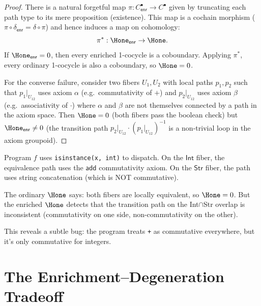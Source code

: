 \begin{proof}
There is a natural forgetful map
$\pi : C^\bullet_\mathsf{enr} \to C^\bullet$ given by truncating
each path type to its mere proposition (existence).  This map is a
cochain morphism ($\pi \circ \delta_\mathsf{enr} =
\delta \circ \pi$) and hence induces a map on cohomology:
\[
  \pi^* : \Hone_\mathsf{enr} \to \Hone.
\]
If $\Hone_\mathsf{enr} = 0$, then every enriched 1-cocycle is a
coboundary.  Applying $\pi^*$, every ordinary 1-cocycle is also a
coboundary, so $\Hone = 0$.

For the converse failure, consider two fibers $U_1, U_2$ with
local paths $p_1, p_2$ such that $p_1|_{U_{12}}$ uses axiom
$\alpha$ (e.g.\ commutativity of $+$) and $p_2|_{U_{12}}$ uses
axiom $\beta$ (e.g.\ associativity of $\cdot$) where
$\alpha$ and $\beta$ are not themselves connected by a path in the
axiom space.  Then $\Hone = 0$ (both fibers pass the boolean check)
but $\Hone_\mathsf{enr} \neq 0$ (the transition path
$p_2|_{U_{12}} \cdot (p_1|_{U_{12}})^{-1}$ is a non-trivial
loop in the axiom groupoid).
\end{proof}

\begin{example}
Program $f$ uses \texttt{isinstance(x, int)} to dispatch.  On the
$\mathsf{Int}$ fiber, the equivalence path uses the $\mathsf{add}$
commutativity axiom.  On the $\mathsf{Str}$ fiber, the path uses
string concatenation (which is NOT commutative).

The ordinary $\Hone$ says: both fibers are locally equivalent, so
$\Hone = 0$.  But the enriched $\Hone$ detects that the transition
path on the Int$\cap$Str overlap is inconsistent (commutativity on
one side, non-commutativity on the other).

This reveals a subtle bug: the program treats \texttt{+} as
commutative everywhere, but it's only commutative for integers.
\end{example}

\section{The Enrichment--Degeneration Tradeoff}

